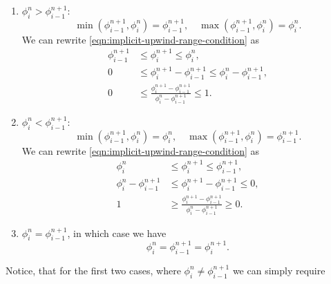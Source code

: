 \documentclass[../thesis.tex]{subfiles}
\begin{document}
\begin{enumerate}
    \item \(\phi_{i}^{n} > \phi_{i-1}^{n+1}:\)
        \[\min\left( \phi_{i-1}^{n+1},\phi_{i}^{n} \right) = \phi_{i-1}^{n+1},\quad
        \max\left( \phi_{i-1}^{n+1},\phi_{i}^{n} \right) = \phi_{i}^{n}.\]
        We can rewrite \eqref{eqn:implicit-upwind-range-condition} as
        \begin{equation*}
            \begin{split}
                \phi_{i-1}^{n+1}
                &\leq
                \phi_{i}^{n+1}
                \leq
                \phi_{i}^{n},
                \\
                0
                &\leq
                \phi_{i}^{n+1} - \phi_{i-1}^{n+1}
                \leq
                \phi_{i}^{n} - \phi_{i-1}^{n+1},
                \\
                0
                &\leq
                \frac{\phi_{i}^{n+1} - \phi_{i-1}^{n+1}}{\phi_{i}^{n} - \phi_{i-1}^{n+1}}
                \leq
                1.
            \end{split}
        \end{equation*}
    \item \(\phi_{i}^{n} < \phi_{i-1}^{n+1}:\)
        \[\min\left( \phi_{i-1}^{n+1},\phi_{i}^{n} \right) = \phi_{i}^{n},\quad
        \max\left( \phi_{i-1}^{n+1},\phi_{i}^{n} \right) = \phi_{i-1}^{n+1}.\]
        We can rewrite \eqref{eqn:implicit-upwind-range-condition} as
        \begin{equation*}
            \begin{split}
                \phi_{i}^{n}
                &\leq
                \phi_{i}^{n+1}
                \leq
                \phi_{i-1}^{n+1},
                \\
                \phi_{i}^{n} - \phi_{i-1}^{n+1}
                &\leq
                \phi_{i}^{n+1} - \phi_{i-1}^{n+1}
                \leq
                0,
                \\
                1
                &\geq
                \frac{\phi_{i}^{n+1} - \phi_{i-1}^{n+1}}{\phi_{i}^{n} - \phi_{i-1}^{n+1}}
                \geq
                0.
            \end{split}
        \end{equation*}
    \item \(\phi_{i}^{n} = \phi_{i-1}^{n+1}\), in which case we have\[\phi_{i}^{n} = \phi_{i-1}^{n+1} = \phi_{i}^{n+1}.\]
\end{enumerate}
Notice, that for the first two cases, where \(\phi_{i}^{n} \neq \phi_{i-1}^{n+1}\) we can simply require
\end{document}
